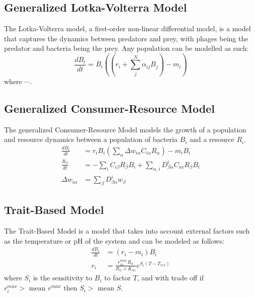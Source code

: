 \subsection{Generalized Lotka-Volterra Model}
The Lotka-Volterra model, a first-order non-linear differential model, is a model that captures the dynamics between predators and prey, with phages being the predator and bacteria being the prey.
Any population can be modelled as such:
\[ 
    \frac{d{B}_i}{dt} = {B}_i \left(\left(r_i + \sum_{j}^{N} \alpha_{ij}{B}_j \right) - m_i\right)
\]
where $\cdots$.
 
\subsection{Generalized Consumer-Resource Model}
The generalized Consumer-Resource Model models the growth of a population and resource dynamics between a population of bacteria ${B}_i$ and a resource ${R}_i$. 
\begin{align}
    \frac{d{B}_i}{dt} &= r_i{B}_i \left(\sum_{\alpha} \Delta w_{i \alpha}C_{i \alpha}R_{\alpha}\right) - m_i {B}_i \\
    \frac{R_{\beta}}{dt} &= -\sum_i C_{i\beta}R_{\beta}{B_i} + \sum_{\alpha, i}D_{\beta\alpha}^{i}C_{i\alpha}R_{\beta}{B}_i \\
    \Delta w_{i\alpha} &= \sum_{\beta}D_{\beta \alpha}^{i}w_{\beta}
\end{align}

\subsection{Trait-Based Model}
The Trait-Based Model is a model that takes into account external factors such as the temperature or pH of the system and can be modeled as follows: 
\begin{align}
    \frac{dB_i}{dt} &= \left(r_i - m_i\right) B_i \\
    r_i &= \frac{r_{i\alpha}^{max}R_\alpha}{R_\alpha + K_{i\alpha}}e^{S_i\left(T-T_{ref}\right)}
\end{align}
where $S_i$ is the sensitivity to $B_i$ to factor $T$, and with trade off if $r_i^{max} > \text{ mean } r^{max} \text{ then } S_i > \text{ mean } S$. 

